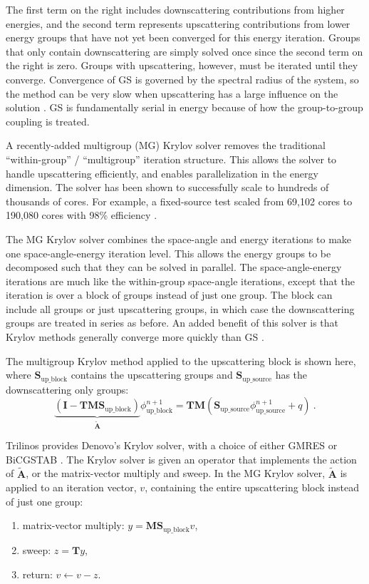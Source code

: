 \documentclass[preprint,12pt]{elsarticle}
\newcommand{\ve}[1]{\ensuremath{\mathbf{#1}}}
\begin{document}
The first term on the right includes downscattering contributions from higher energies, and the second term represents upscattering contributions from lower energy groups that have not yet been converged for this energy iteration. Groups that only contain downscattering are simply solved once since the second term on the right is zero. Groups with upscattering, however, must be iterated until they converge. Convergence of GS is governed by the spectral radius of the system, so the method can be very slow when upscattering has a large influence on the solution \cite{Adams2002}. GS is fundamentally serial in energy because of how the group-to-group coupling is treated. 

A recently-added multigroup (MG) Krylov solver removes the traditional \\``within-group'' / ``multigroup'' iteration structure. This allows the solver to handle upscattering efficiently, and enables parallelization in the energy dimension. The solver has been shown to successfully scale to hundreds of thousands of cores. For example, a fixed-source test scaled from 69,102 cores to 190,080 cores with 98\% efficiency \cite{Slaybaugh2011}. 

The MG Krylov solver combines the space-angle and energy iterations to make one space-angle-energy iteration level. This allows the energy groups to be decomposed such that they can be solved in parallel. The space-angle-energy iterations are much like the within-group space-angle iterations, except that the iteration is over a block of groups instead of just one group. The block can include all groups or just upscattering groups, in which case the downscattering groups are treated in series as before. An added benefit of this solver is that Krylov methods generally converge more quickly than GS \cite{Trefethen1997}.

The multigroup Krylov method applied to the upscattering block is shown here, where $\ve{S}_{\text{up\_block}}$ contains the upscattering groups and $\ve{S}_{\text{up\_source}}$ has the downscattering only groups:
%
\begin{equation}
  \underbrace{(\ve{I} - \ve{TMS}_{\text{up\_block}})}_{\tilde{\ve{A}}}\phi_{\text{up\_block}}^{n+1} = \ve{TM}(\ve{S}_{\text{up\_source}}\phi_{\text{up\_source}}^{n+1} + q) \:.
  \label{eq:MGkrylov}
\end{equation}

Trilinos \cite{1089021} provides Denovo's Krylov solver, with a choice of either GMRES or BiCGSTAB \cite{Evans2010}. The Krylov solver is given an operator that implements the action of $\ve{\tilde{A}}$, or the matrix-vector multiply and sweep. In the MG Krylov solver, $\ve{\tilde{A}}$ is applied to an iteration vector, $v$, containing the entire upscattering block instead of just one group:
%
\begin{enumerate}
  \item matrix-vector multiply: $y = \ve{M}\ve{S}_{\text{up\_block}} v$,
  \item sweep: $z = \ve{T} y$,
  \item return: $v \leftarrow v - z$.
\end{enumerate}
\end{document}
